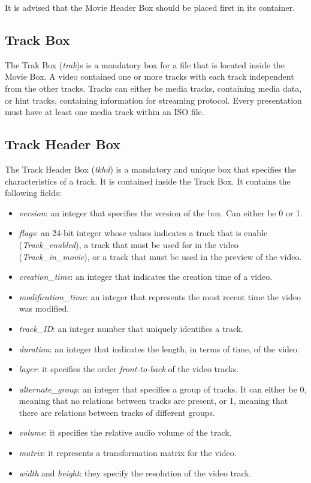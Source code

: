 It is advised that the Movie Header Box should be placed first in its container.

\subsection*{Track Box}

The Trak Box (\emph{trak})s is a mandatory box for a file that is located inside the Movie Box. A video contained one or more tracks with each track independent from the other tracks. Tracks can either be media tracks, containing media data, or hint tracks, containing information for streaming protocol. Every presentation must have at least one media track within an ISO file.

\subsection*{Track Header Box}

The Track Header Box (\emph{tkhd}) is a mandatory and unique box that specifies the characteristics of a track. It is contained inside the Track Box. It contains the following fields:

\begin{itemize}
\item \emph{version}: an integer that specifies the version of the box. Can either be 0 or 1.
\item \emph{flags}: an 24-bit integer whose values indicates a track that is enable (\emph{Track\_enabled}), a track that must be used for in the video (\emph{Track\_in\_movie}), or a track that must be used in the preview of the video.
\item \emph{creation\_time}: an integer that indicates the creation time of a video.
\item \emph{modification\_time}: an integer that represents the most recent time the video was modified.
\item \emph{track\_ID}: an integer number that uniquely identifies a track.
\item \emph{duration}: an integer that indicates the length, in terms of time, of the video.
\item \emph{layer}: it specifies the order \emph{front-to-back} of the video tracks.
\item \emph{alternate\_group}: an integer that specifies a group of tracks. It can either be 0, meaning that no relations between tracks are present, or 1, meaning that there are relations between tracks of different groups.
\item \emph{volume}: it specifies the relative audio volume of the track.
\item \emph{matrix}: it represents a transformation matrix for the video.
\item \emph{width} and \emph{height}: they specify the resolution of the video track.
\end{itemize}


